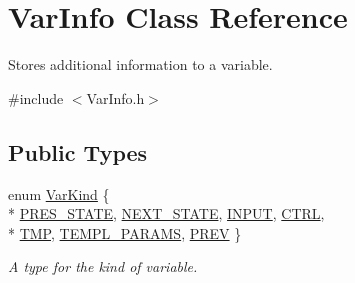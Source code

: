 \hypertarget{classVarInfo}{\section{Var\-Info Class Reference}
\label{classVarInfo}
}


Stores additional information to a variable.  




{\ttfamily \#include $<$Var\-Info.\-h$>$}

\subsection*{Public Types}
\begin{DoxyCompactItemize}
\item 
enum \hyperlink{classVarInfo_a64d1da76cf84fe674e5fef9764ef11cf}{Var\-Kind} \{ \\*
\hyperlink{classVarInfo_a64d1da76cf84fe674e5fef9764ef11cfad06079e472b753ace9a0656b033586de}{P\-R\-E\-S\-\_\-\-S\-T\-A\-T\-E}, 
\hyperlink{classVarInfo_a64d1da76cf84fe674e5fef9764ef11cfa5cfac3e54e780e889e1ed016861ca170}{N\-E\-X\-T\-\_\-\-S\-T\-A\-T\-E}, 
\hyperlink{classVarInfo_a64d1da76cf84fe674e5fef9764ef11cfa4b3587d08eaa52e4bcdfb2cf518e965b}{I\-N\-P\-U\-T}, 
\hyperlink{classVarInfo_a64d1da76cf84fe674e5fef9764ef11cfa39217e7a3badb511b3cf3995f73ad5d9}{C\-T\-R\-L}, 
\\*
\hyperlink{classVarInfo_a64d1da76cf84fe674e5fef9764ef11cfa84a2d8d86f004930fe564dc5b395b29f}{T\-M\-P}, 
\hyperlink{classVarInfo_a64d1da76cf84fe674e5fef9764ef11cfa5df778a9d0a12c26b1725f2440d66ff4}{T\-E\-M\-P\-L\-\_\-\-P\-A\-R\-A\-M\-S}, 
\hyperlink{classVarInfo_a64d1da76cf84fe674e5fef9764ef11cfa055ef2ea16e83d02bc2b9f2f7f7666df}{P\-R\-E\-V}
 \}
\begin{DoxyCompactList}\small\item\em A type for the kind of variable. \end{DoxyCompactList}\end{DoxyCompactItemize}
